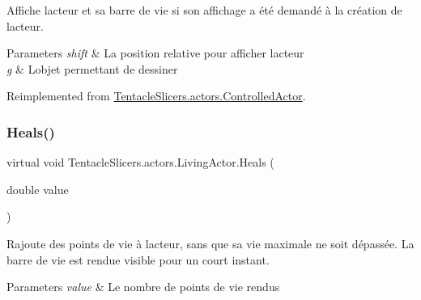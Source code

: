 Affiche l\textquotesingle{}acteur et sa barre de vie si son affichage a été demandé à la création de l\textquotesingle{}acteur. 


\begin{DoxyParams}{Parameters}
{\em shift} & La position relative pour afficher l\textquotesingle{}acteur \\
\hline
{\em g} & L\textquotesingle{}objet permettant de dessiner \\
\hline
\end{DoxyParams}


Reimplemented from \hyperlink{class_tentacle_slicers_1_1actors_1_1_controlled_actor_a8120affe933e4003bc0866f06589eeac}{Tentacle\+Slicers.\+actors.\+Controlled\+Actor}.

\mbox{\label{class_tentacle_slicers_1_1actors_1_1_living_actor_ad91b82ee0b4708cb8cb1b305738dde10}} 
\subsubsection{\texorpdfstring{Heals()}{Heals()}}
{\footnotesize\ttfamily virtual void Tentacle\+Slicers.\+actors.\+Living\+Actor.\+Heals (\begin{DoxyParamCaption}\item[{double}]{value }\end{DoxyParamCaption})\hspace{0.3cm}{\ttfamily [virtual]}}



Rajoute des points de vie à l\textquotesingle{}acteur, sans que sa vie maximale ne soit dépassée. La barre de vie est rendue visible pour un court instant. 


\begin{DoxyParams}{Parameters}
{\em value} & Le nombre de points de vie rendus \\
\hline
\end{DoxyParams}
\mbox{\label{class_tentacle_slicers_1_1actors_1_1_living_actor_abb76b0632c685efe4592cc8fafa11639}} 
